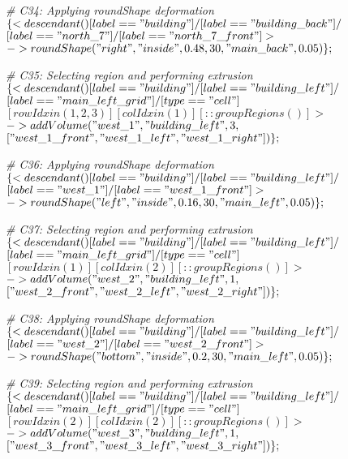\noindent \textit{\# C34: Applying roundShape deformation}\\
$\{< descendant() [label=="building"] / [label=="building\_back"] / $\\
$[label=="north\_7"] / [label=="north\_7\_front"] > $\\
$-> roundShape("right", "inside", 0.48, 30, "main\_back", 0.05)\};$

\noindent \textit{\# C35: Selecting region and performing extrusion}\\
$\{< descendant() [label=="building"] / [label=="building\_left"] / $\\
$[label=="main\_left\_grid"] / [type=="cell"] $\\
$[rowIdx in (1, 2, 3)] [colIdx in (1)] [::groupRegions()] > $\\
$-> addVolume("west\_1", "building\_left", 3, $\\
$["west\_1\_front", "west\_1\_left", "west\_1\_right"])\};$

\noindent \textit{\# C36: Applying roundShape deformation}\\
$\{< descendant() [label=="building"] / [label=="building\_left"] / $\\
$[label=="west\_1"] / [label=="west\_1\_front"] > $\\
$-> roundShape("left", "inside", 0.16, 30, "main\_left", 0.05)\};$

\noindent \textit{\# C37: Selecting region and performing extrusion}\\
$\{< descendant() [label=="building"] / [label=="building\_left"] / $\\
$[label=="main\_left\_grid"] / [type=="cell"] $\\
$[rowIdx in (1)] [colIdx in (2)] [::groupRegions()] > $\\
$-> addVolume("west\_2", "building\_left", 1, $\\
$["west\_2\_front", "west\_2\_left", "west\_2\_right"])\};$

\noindent \textit{\# C38: Applying roundShape deformation}\\
$\{< descendant() [label=="building"] / [label=="building\_left"] / $\\
$[label=="west\_2"] / [label=="west\_2\_front"] > $\\
$-> roundShape("bottom", "inside", 0.2, 30, "main\_left", 0.05)\};$

\noindent \textit{\# C39: Selecting region and performing extrusion}\\
$\{< descendant() [label=="building"] / [label=="building\_left"] / $\\
$[label=="main\_left\_grid"] / [type=="cell"] $\\
$[rowIdx in (2)] [colIdx in (2)] [::groupRegions()] > $\\
$-> addVolume("west\_3", "building\_left", 1, $\\
$["west\_3\_front", "west\_3\_left", "west\_3\_right"])\};$

